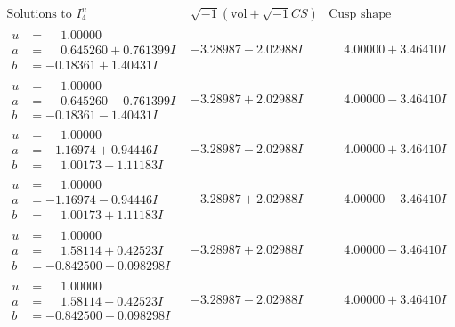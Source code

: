 \documentclass[1p]{elsarticle_modified}
\theoremstyle{definition}
\newcommand{\I}{\sqrt{-1}}
\begin{document}
$$\begin{array}{c|c|c}  
\text{Solutions to }I^u_{4}& \I (\text{vol} + \sqrt{-1}CS) & \text{Cusp shape}\\
 \hline 
\begin{aligned}
u &= \phantom{-}1.00000\phantom{ +0.000000I} \\
a &= \phantom{-}0.645260 + 0.761399 I \\
b &= -0.18361 + 1.40431 I\end{aligned}
 & -3.28987 - 2.02988 I & \phantom{-}4.00000 + 3.46410 I \\ \hline\begin{aligned}
u &= \phantom{-}1.00000\phantom{ +0.000000I} \\
a &= \phantom{-}0.645260 - 0.761399 I \\
b &= -0.18361 - 1.40431 I\end{aligned}
 & -3.28987 + 2.02988 I & \phantom{-}4.00000 - 3.46410 I \\ \hline\begin{aligned}
u &= \phantom{-}1.00000\phantom{ +0.000000I} \\
a &= -1.16974 + 0.94446 I \\
b &= \phantom{-}1.00173 - 1.11183 I\end{aligned}
 & -3.28987 - 2.02988 I & \phantom{-}4.00000 + 3.46410 I \\ \hline\begin{aligned}
u &= \phantom{-}1.00000\phantom{ +0.000000I} \\
a &= -1.16974 - 0.94446 I \\
b &= \phantom{-}1.00173 + 1.11183 I\end{aligned}
 & -3.28987 + 2.02988 I & \phantom{-}4.00000 - 3.46410 I \\ \hline\begin{aligned}
u &= \phantom{-}1.00000\phantom{ +0.000000I} \\
a &= \phantom{-}1.58114 + 0.42523 I \\
b &= -0.842500 + 0.098298 I\end{aligned}
 & -3.28987 + 2.02988 I & \phantom{-}4.00000 - 3.46410 I \\ \hline\begin{aligned}
u &= \phantom{-}1.00000\phantom{ +0.000000I} \\
a &= \phantom{-}1.58114 - 0.42523 I \\
b &= -0.842500 - 0.098298 I\end{aligned}
 & -3.28987 - 2.02988 I & \phantom{-}4.00000 + 3.46410 I \\ \hline\begin{aligned}

\end{aligned}
\end{array}$$
\end{document}
